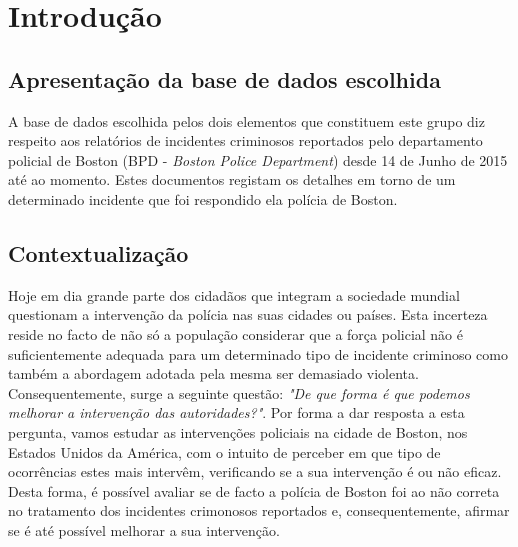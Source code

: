 \documentclass[a4paper]{report}
\begin{document}
\chapter{Introdução} \label{intro}
\large{
    \section{Apresentação da base de dados escolhida}
	A base de dados escolhida pelos dois elementos que constituem este grupo diz respeito aos relatórios de incidentes criminosos reportados pelo departamento policial de Boston 
	(BPD - \textit{Boston Police Department}) desde 14 de Junho de 2015 até ao momento. Estes documentos registam os detalhes em torno de um determinado incidente que foi respondido 
	ela polícia de Boston.
	
	\section{Contextualização}
	Hoje em dia grande parte dos cidadãos que integram a sociedade mundial questionam a intervenção da polícia nas suas cidades ou países. Esta incerteza reside no facto de não só
	a população considerar que a força policial não é suficientemente adequada para um determinado tipo de incidente criminoso como também a abordagem adotada pela mesma ser demasiado 
	violenta. Consequentemente, surge a seguinte questão: \textit{"De que forma é que podemos melhorar a intervenção das autoridades?"}. Por forma a dar resposta a esta pergunta, vamos 
	estudar as intervenções policiais na cidade de Boston, nos Estados Unidos da América, com o intuito de perceber em que tipo de ocorrências estes mais intervêm, verificando se a sua 
	intervenção é ou não eficaz. Desta forma, é possível avaliar se de facto a polícia de Boston foi ao não correta no tratamento dos incidentes crimonosos reportados e, consequentemente, 
	afirmar se é até possível melhorar a sua intervenção.
	
}
\end{document}
